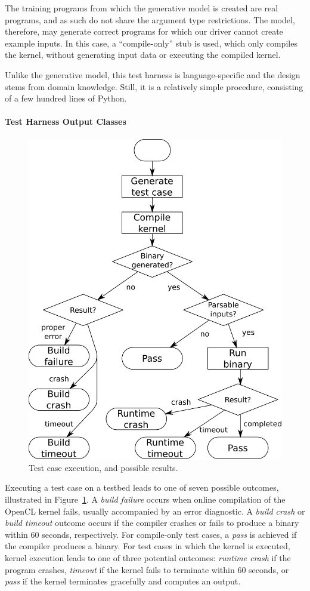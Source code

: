 The training programs from which the generative model is created are real
programs, and as such do not share the argument type restrictions. The model,
therefore, may generate correct programs for which our driver cannot create
example inputs. In this case, a ``compile-only'' stub is used, which only
compiles the kernel, without generating input data or executing the compiled
kernel.

Unlike the generative model, this test harness is language-specific and the
design stems from domain knowledge. Still, it is a relatively simple procedure,
consisting of a few hundred lines of Python.

\paragraph*{Test Harness Output Classes}
\begin{figure}
  \centering %
  \includegraphics[width=.7\columnwidth]{img/testprocess-long}
  \vspace{-.5em}
  \caption{%
    Test case execution, and possible results.%
    \vspace{-1.5em}
  }%
  \label{fig:test-process} %
\end{figure}
Executing a test case on a testbed leads to one of seven possible outcomes,
illustrated in Figure~\ref{fig:test-process}. A \emph{build failure} occurs when
online compilation of the OpenCL kernel fails, usually accompanied by an error
diagnostic. A \emph{build crash} or \emph{build timeout} outcome occurs if the
compiler crashes or fails to produce a binary within 60 seconds, respectively.
For compile-only test cases, a \emph{pass} is achieved if the compiler produces
a binary. For test cases in which the kernel is executed, kernel execution leads
to one of three potential outcomes: \emph{runtime crash} if the program crashes,
\emph{timeout} if the kernel fails to terminate within 60 seconds, or
\emph{pass} if the kernel terminates gracefully and computes an output.

